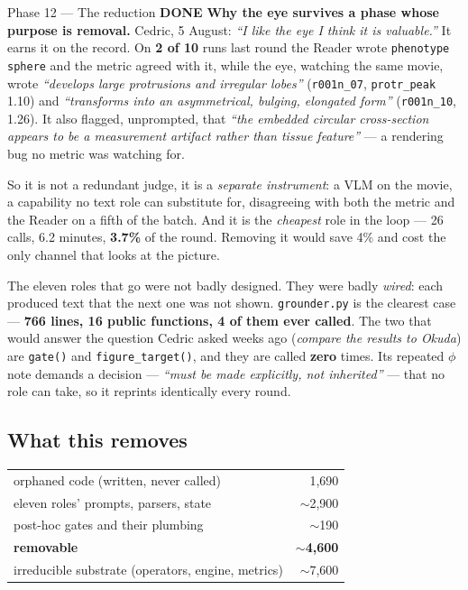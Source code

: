 \documentclass[11pt,a4paper]{article}
\newcommand{\code}[1]{\texttt{#1}}
\newcommand{\done}{\textcolor{good}{\textbf{DONE}}}
\begin{document}
\begin{phasebox}{Phase 12 --- The reduction \hfill \done}
\noindent \textbf{Why the eye survives a phase whose purpose is removal.} Cedric, 5 August:
\emph{``I like the eye I think it is valuable.''} It earns it on the record. On \textbf{2 of 10} runs
last round the Reader wrote \code{phenotype sphere} and the metric agreed with it, while the eye,
watching the same movie, wrote \emph{``develops large protrusions and irregular lobes''}
(\code{r001n\_07}, \code{protr\_peak} 1.10) and \emph{``transforms into an asymmetrical, bulging,
elongated form''} (\code{r001n\_10}, 1.26). It also flagged, unprompted, that \emph{``the embedded
circular cross-section appears to be a measurement artifact rather than tissue feature''} --- a
rendering bug no metric was watching for.

So it is not a redundant judge, it is a \emph{separate instrument}: a VLM on the movie, a capability
no text role can substitute for, disagreeing with both the metric and the Reader on a fifth of the
batch. And it is the \emph{cheapest} role in the loop --- 26 calls, 6.2 minutes, \textbf{3.7\%} of
the round. Removing it would save 4\% and cost the only channel that looks at the picture.

The eleven roles that go were not badly designed. They were badly \emph{wired}: each produced text
that the next one was not shown. \code{grounder.py} is the clearest case --- \textbf{766 lines, 16
public functions, 4 of them ever called}. The two that would answer the question Cedric asked weeks
ago (\emph{compare the results to Okuda}) are \code{gate()} and \code{figure\_target()}, and they are
called \textbf{zero} times. Its repeated $\phi$ note demands a decision --- \emph{``must be made
explicitly, not inherited''} --- that no role can take, so it reprints identically every round.

\subsection*{What this removes}
\begin{center}\small
\begin{tabular}{lr}
\toprule
orphaned code (written, never called)      & 1{,}690 \\
eleven roles' prompts, parsers, state      & $\sim$2{,}900 \\
post-hoc gates and their plumbing          & $\sim$190 \\
\midrule
\textbf{removable}                         & $\sim$\textbf{4{,}600} \\
irreducible substrate (operators, engine, metrics) & $\sim$7{,}600 \\
\bottomrule
\end{tabular}
\end{center}


\end{phasebox}
\end{document}
